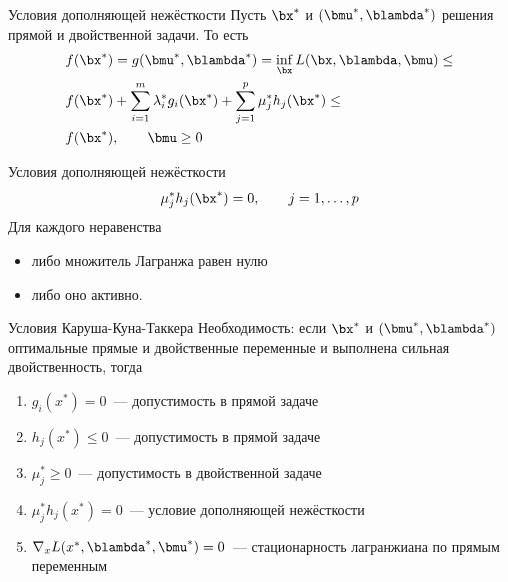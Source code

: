 \documentclass[12pt]{beamer}
\begin{document}
\begin{frame}{Условия дополняющей нежёсткости}
Пусть $\bx^*$ и $(\bmu^*, \blambda^*)$ решения прямой и двойственной задачи. То есть
\begin{equation*}
\begin{split}
& f(\bx^*) = g(\bmu^*, \blambda^*) = \inf\limits_{\bx} L(\bx, \blambda, \bmu) \leq \\
& f(\bx^*) + \sum\limits_{i=1}^m\lambda^*_i g_i(\bx^*) + \sum\limits_{j=1}^p \mu^*_j h_j(\bx^*) \leq\\
& f(\bx^*), \qquad \bmu \geq 0 
\end{split}
\end{equation*}

\begin{block}{Условия дополняющей нежёсткости}
\[
\mu^*_j h_j(\bx^*) = 0, \qquad j = 1,\ldots,p 
\]
Для каждого неравенства
\begin{itemize}
\item либо множитель Лагранжа равен нулю
\item либо оно активно.
\end{itemize} 
\end{block}
\end{frame}

\begin{frame}{Условия Каруша-Куна-Таккера}
Необходимость: если $\bx^*$ и  $(\bmu^*, \blambda^*)$ оптимальные прямые и двойственные переменные и выполнена сильная двойственность, тогда
\begin{enumerate}
\item $g_i(x^*) = 0$~--- допустимость в прямой задаче
\item $h_j(x^*) \leq 0$~--- допустимость в прямой задаче
\item $ \mu^*_j \geq 0$~--- допустимость в двойственной задаче
\item $\mu^*_jh_j(x^*) = 0$~--- условие дополняющей нежёсткости
\item $\nabla_x L(x^*, \blambda^*, \bmu^*) = 0$~--- стационарность лагранжиана по прямым переменным
\end{enumerate}
\end{frame}
\end{document}
